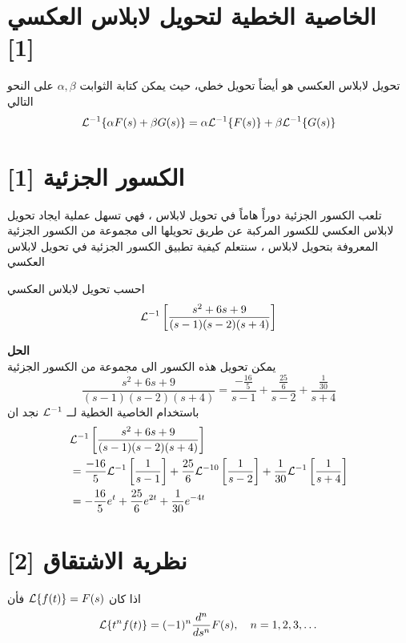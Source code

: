  \section[الخاصية الخطية لتحويل لابلاس العكسي]{الخاصية الخطية لتحويل لابلاس العكسي [1]}
  تحويل لابلاس العكسي هو أيضاً تحويل خطي، حيث يمكن كتابة الثوابت $\alpha, \beta$ على  النحو التالي
  \begin{equation}
  	\mathcal{L}^{-1} \{\alpha F(s) + \beta G(s)\} = \alpha \mathcal{L}^{-1} \{F(s)\} + \beta \mathcal{L}^{-1} \{G(s)\}
  \end{equation}
  
  \section[الكسور الجزئية]{الكسور الجزئية [1]}
 تلعب الكسور الجزئية دوراً هاماً في تحويل لابلاس ، فهي تسهل عملية ايجاد تحويل لابلاس العكسي للكسور المركبة عن طريق تحويلها الى مجموعة من الكسور الجزئية المعروفة بتحويل لابلاس ، سنتعلم كيفية تطبيق الكسور الجزئية في تحويل لابلاس العكسي
 
 \begin{example}
 	احسب تحويل لابلاس العكسي
 	\[
 	\mathcal{L}^{-1} \left[\frac{s^2 + 6s + 9}{(s-1)(s-2)(s+4)}\right]
 	\]
 \end{example}
 \noindent
 \textbf{الحل}\\
 \noindent
 يمكن تحويل هذه الكسور الى مجموعة من الكسور الجزئية 
 \[
 \frac{s^2 + 6s + 9}{(s-1)(s-2)(s+4)} = \frac{-\frac{16}{5}}{s-1} + \frac{\frac{25}{6}}{s-2} + \frac{\frac{1}{30}}{s+4}
 \]
 باستخدام الخاصية الخطية لــ $\mathcal{L}^{-1}$ نجد ان 
 \begin{align*}
 	&\mathcal{L}^{-1} \left[\frac{s^2 + 6s + 9}{(s-1)(s-2)(s+4)}\right]\\
 	 &= \frac{-16}{5}\mathcal{L}^{-1}\left[\frac{1}{s-1}\right] + \frac{25}{6} \mathcal{L}^{-10}\left[\frac{1}{s-2}\right] + \frac{1}{30} \mathcal{L}^{-1}\left[\frac{1}{s+4}\right]\\
 	 &=-\frac{16}{5}e^{t} + \frac{25}{6} e^{2t} + \frac{1}{30 } e^{-4t}
  \end{align*}
  
  \section[نظرية الاشتقاق]{نظرية الاشتقاق [2]}
  \begin{theorem}
  	اذا كان $\mathcal{L}\{f(t)\} = F(s)$ فأن
  	\[
  	\mathcal{L}\{t^n f(t)\} = (-1)^n \frac{d^n}{ds^n} F(s), \quad n=1,2,3,\dots
   	\]
  \end{theorem}
  
